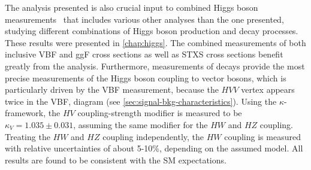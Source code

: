 The analysis presented is also crucial input to combined Higgs boson measurements~\cite{NaturePaper} that includes various other analyses than the one presented, studying different combinations of Higgs boson production and decay processes.
These results were presented in \cref{chap:higgs}.
The combined measurements of both inclusive VBF and ggF cross sections as well as STXS cross sections benefit greatly from the \HWW analysis.
Furthermore, measurements of \HWW decays provide the most precise measurements of the Higgs boson coupling to vector bosons, which is particularly driven by the VBF measurement, because the $HVV$ vertex appears twice in the VBF, \HWW diagram (see \cref{sec:signal-bkg-characteristics}). 
Using the $\kappa$-framework, the $HV$ coupling-strength modifier is measured to be $\kappa_{V} = 1.035 \pm 0.031$, assuming the same modifier for the $HW$ and $HZ$ coupling.
Treating the $HW$ and $HZ$ coupling independently, the $HW$ coupling is measured with relative uncertainties of about 5-10\%, depending on the assumed model. All results are found to be consistent with the SM expectations. 





